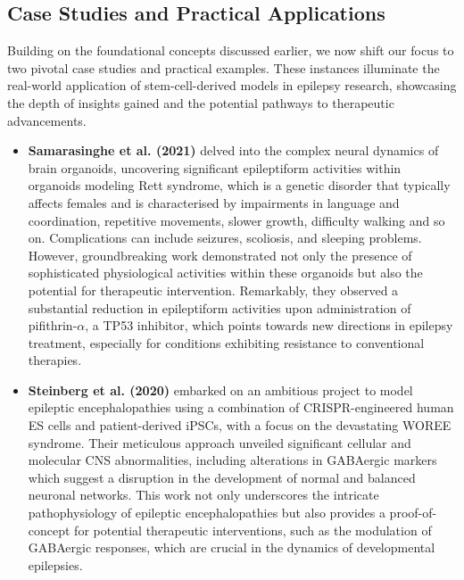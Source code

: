 \documentclass[10pt]{article}
\begin{document}
\begin{sloppypar}
  \subsection{Case Studies and Practical Applications}
  \label{sec:case-studies-and-practical-applications}

  Building on the foundational concepts discussed earlier, we now shift our focus to two pivotal case studies and practical examples. These instances illuminate the real-world application of stem-cell-derived models in epilepsy research, showcasing the depth of insights gained and the potential pathways to therapeutic advancements.

  \vspace{0.5cm} %

  \begin{itemize}[leftmargin=*]
    \item \textbf{Samarasinghe et al. (2021)} delved into the complex neural dynamics of brain organoids, uncovering significant epileptiform activities within organoids modeling Rett syndrome, which is a genetic disorder that typically affects females and is characterised by impairments in language and coordination, repetitive movements, slower growth, difficulty walking and so on. Complications can include seizures, scoliosis, and sleeping problems. However, \citeauthor{samarasinghe_identification_2021} groundbreaking work demonstrated not only the presence of sophisticated physiological activities within these organoids but also the potential for therapeutic intervention. Remarkably, they observed a substantial reduction in epileptiform activities upon administration of pifithrin-$\alpha$, a TP53 inhibitor, which points towards new directions in epilepsy treatment, especially for conditions exhibiting resistance to conventional therapies.

    \item \textbf{Steinberg et al. (2020)} embarked on an ambitious project to model epileptic encephalopathies using a combination of CRISPR-engineered human ES cells and patient-derived iPSCs, with a focus on the devastating WOREE syndrome. Their meticulous approach unveiled significant cellular and molecular CNS abnormalities, including alterations in GABAergic markers which suggest a disruption in the development of normal and balanced neuronal networks. This work not only underscores the intricate pathophysiology of epileptic encephalopathies but also provides a proof-of-concept for potential therapeutic interventions, such as the modulation of GABAergic responses, which are crucial in the dynamics of developmental epilepsies.
  \end{itemize}


\end{sloppypar}
\end{document}
